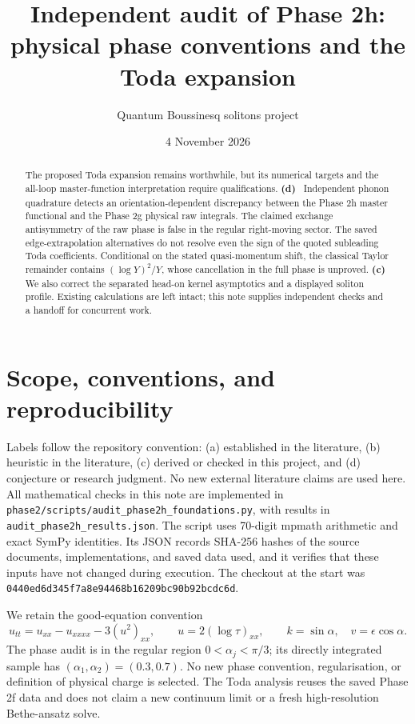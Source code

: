 \documentclass[11pt,a4paper]{article}
\title{Independent audit of Phase 2h:\\physical phase conventions and the Toda expansion}
\author{Quantum Boussinesq solitons project}
\date{4 November 2026}
\newcommand{\Lc}{\textsf{\textbf{(c)}}\ }
\newcommand{\Ld}{\textsf{\textbf{(d)}}\ }
\newcommand{\scr}{\texttt{audit\_\allowbreak phase2h\_\allowbreak foundations.py}}
\begin{document}
\maketitle
\begin{abstract}
The proposed Toda expansion remains worthwhile, but its numerical targets and
the all-loop master-function interpretation require qualifications. \Ld
Independent phonon quadrature detects an orientation-dependent discrepancy
between the Phase 2h master functional and the Phase 2g physical raw integrals.
The claimed exchange antisymmetry of the raw phase is false in the regular
right-moving sector. The saved edge-extrapolation alternatives do not resolve
even the sign of the quoted subleading Toda coefficients. Conditional on the
stated quasi-momentum shift, the classical Taylor remainder contains
$(\log Y)^2/Y$, whose cancellation in the full phase is unproved. \Lc
We also correct the separated head-on kernel asymptotics and a displayed
soliton profile. Existing calculations are left intact; this note supplies
independent checks and a handoff for concurrent work.
\end{abstract}

\section{Scope, conventions, and reproducibility}
Labels follow the repository convention: (a) established in the literature,
(b) heuristic in the literature, (c) derived or checked in this project,
and (d) conjecture or research judgment. No new external literature claims
are used here. All mathematical checks in this note are implemented in
\texttt{phase2/scripts/}\scr, with results in
\texttt{audit\_phase2h\_results.json}. The script uses 70-digit mpmath arithmetic
and exact SymPy identities. Its JSON records SHA-256 hashes of the source
documents, implementations, and saved data used, and it verifies that these
inputs have not changed during execution. The checkout at the start was
\texttt{0440ed6d345f7a8e94468b16209bc90b92bcdc6d}.

We retain the good-equation convention
\[
 u_{tt}=u_{xx}-u_{xxxx}-3(u^2)_{xx},\qquad
 u=2(\log\tau)_{xx},\qquad k=\sin\alpha,\quad v=\epsilon\cos\alpha.
\]
The phase audit is in the regular region $0<\alpha_j<\pi/3$; its directly
integrated sample has $(\alpha_1,\alpha_2)=(0.3,0.7)$. No new phase convention,
regularisation, or definition of physical charge is selected. The Toda
analysis reuses the saved Phase 2f data and does not claim a new continuum
limit or a fresh high-resolution Bethe-ansatz solve.
\end{document}
